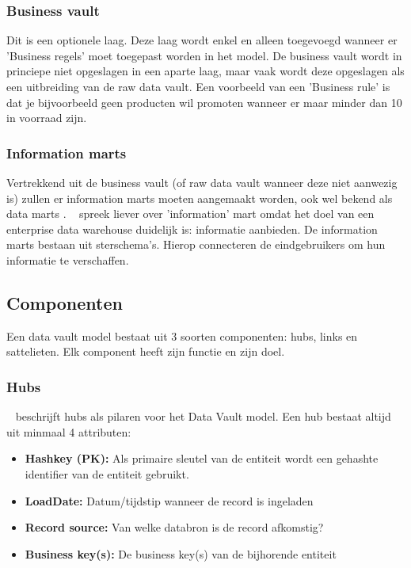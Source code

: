 \subsubsection{Business vault}
Dit is een optionele laag. Deze laag wordt enkel en alleen toegevoegd wanneer er 'Business regels' moet toegepast worden in het model. De business vault wordt in princiepe niet opgeslagen in een aparte laag, maar vaak wordt deze opgeslagen als een uitbreiding van de raw data vault. Een voorbeeld van een 'Business rule' is dat je bijvoorbeeld geen producten wil promoten wanneer er maar minder dan 10 in voorraad zijn.

\subsubsection{Information marts}
Vertrekkend uit de business vault (of raw data vault wanneer deze niet aanwezig is) zullen er information marts moeten aangemaakt worden, ook wel bekend als data marts . ~\textcite{Linstedt2016} spreek liever over 'information' mart omdat het doel van een enterprise data warehouse duidelijk is: informatie aanbieden. 
De information marts bestaan uit sterschema's. Hierop connecteren de eindgebruikers om hun informatie te verschaffen. 

\subsection{Componenten}
Een data vault model bestaat uit 3 soorten componenten: hubs, links en sattelieten. Elk component heeft zijn functie en zijn doel.

\subsubsection{Hubs}
~\textcite{Linstedt2016} beschrijft hubs als pilaren voor het Data Vault model. Een hub bestaat altijd uit minmaal 4 attributen:

\begin{itemize}
	\item \textbf{Hashkey (PK):} Als primaire sleutel van de entiteit wordt een gehashte identifier van de entiteit gebruikt.
	\item \textbf{LoadDate:} Datum/tijdstip wanneer de record is ingeladen
	\item \textbf{Record source:} Van welke databron is de record afkomstig?
	\item \textbf{Business key(s):} De business key(s) van de bijhorende entiteit
\end{itemize} 

